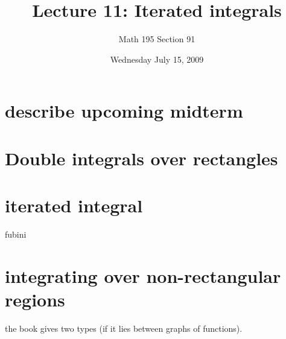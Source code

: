 \documentclass[12pt]{article}
\title{Lecture 11: Iterated integrals}
\author{Math 195 Section 91}
\date{Wednesday July 15, 2009}
\begin{document}
\maketitle

\section{describe upcoming midterm}

\section{Double integrals over rectangles}

\section{iterated integral}

fubini

\section{integrating over non-rectangular regions}

the book gives two types (if it lies between graphs of functions).
\end{document}
